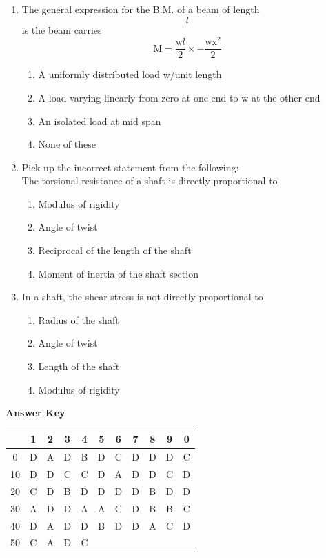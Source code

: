 \documentclass[11pt,a4paper]{article}
\begin{document}
\begin{enumerate}
\item{The general expression for the B.M. of a beam of length $$l$$ is the beam carries $${\text{M}} = \frac{{{\text{w}}l}}{2} \times - \frac{{{\text{w}}{{\text{x}}^2}}}{2}$$}
\begin{enumerate}[label=\Alph*.]
\item{A uniformly distributed load w/unit length}
\item{A load varying linearly from zero at one end to w at the other end}
\item{An isolated load at mid span}
\item{None of these}
\end{enumerate}
\item{Pick up the incorrect statement from the following: \\

The torsional resistance of a shaft is directly proportional to}
\begin{enumerate}[label=\Alph*.]
\item{Modulus of rigidity}
\item{Angle of twist}
\item{Reciprocal of the length of the shaft}
\item{Moment of inertia of the shaft section }
\end{enumerate}
\item{In a shaft, the shear stress is not directly proportional to}
\begin{enumerate}[label=\Alph*.]
\item{Radius of the shaft}
\item{Angle of twist}
\item{Length of the shaft}
\item{Modulus of rigidity}
\end{enumerate}
\end{enumerate}
\textbf{Answer Key}
\begin{tabular}{ | c | c c c c c c c c c c | }
\hline
 & 1 & 2 & 3 & 4 & 5 & 6 & 7 & 8 & 9 & 0 \\
\hline
0 & D & A & D & B & D & C & D & D & D & C \\
10 & D & D & C & C & D & A & D & D & C & D \\
20 & C & D & B & D & D & D & D & B & D & D \\
30 & A & D & D & A & A & C & D & B & B & C \\
40 & D & A & D & D & B & D & D & A & C & D \\
50 & C & A & D & C &   &   &   &   &   &   \\
\hline
\end{tabular}
\clearpage
\end{document}
